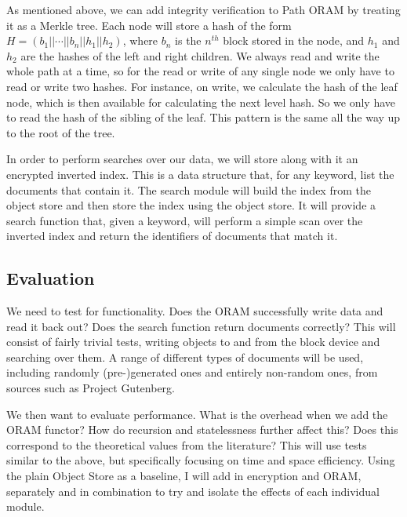 \documentclass[12pt,a4paper,twoside]{article}
\begin{document}

As mentioned above, we can add integrity verification to Path ORAM by treating it as a Merkle tree. Each node will store a hash of the form $H = (b_1||\cdots||b_n||h_1||h_2)$, where $b_n$ is the $n^{th}$ block stored in the node, and $h_1$ and $h_2$ are the hashes of the left and right children. We always read and write the whole path at a time, so for the read or write of any single node we only have to read or write two hashes. For instance, on write, we calculate the hash of the leaf node, which is then available for calculating the next level hash. So we only have to read the hash of the sibling of the leaf. This pattern is the same all the way up to the root of the tree.


In order to perform searches over our data, we will store along with it an encrypted inverted index. This is a data structure that, for any keyword, list the documents that contain it. The search module will build the index from the object store and then store the index using the object store. It will provide a search function that, given a keyword, will perform a simple scan over the inverted index and return the identifiers of documents that match it.


\subsection*{Evaluation}

We need to test for functionality. Does the ORAM successfully write data and read it back out? Does the search function return documents correctly? This will consist of fairly trivial tests, writing objects to and from the block device and searching over them. A range of different types of documents will be used, including randomly (pre-)generated ones and entirely non-random ones, from sources such as Project Gutenberg.

We then want to evaluate performance. What is the overhead when we add the ORAM functor? How do recursion and statelessness further affect this? Does this correspond to the theoretical values from the literature? This will use tests similar to the above, but specifically focusing on time and space efficiency. Using the plain Object Store as a baseline, I will add in encryption and ORAM, separately and in combination to try and isolate the effects of each individual module. 
\end{document}
